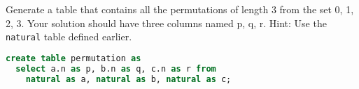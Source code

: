 \question Generate a table that contains all the permutations of length 3 from
the set {0, 1, 2, 3}. Your solution should have three columns named p, q, r.
Hint: Use the \texttt{natural} table defined earlier.

\begin{solution}[1in]
\begin{lstlisting}[language=SQL]
create table permutation as
  select a.n as p, b.n as q, c.n as r from
    natural as a, natural as b, natural as c;
\end{lstlisting}
\end{solution}
